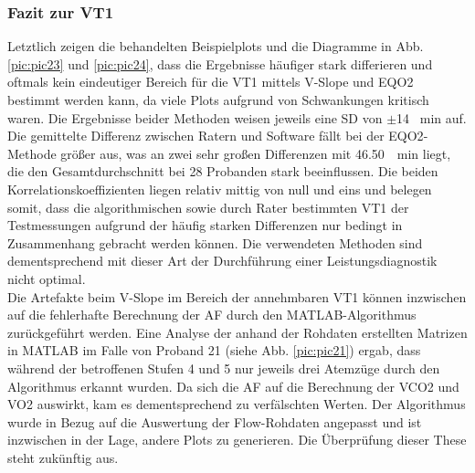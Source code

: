 \subsubsection{Fazit zur VT1}
%
Letztlich zeigen die behandelten Beispielplots und die Diagramme in Abb. \ref{pic:pic23} und \ref{pic:pic24}, dass die Ergebnisse häufiger stark differieren und oftmals kein eindeutiger Bereich für die VT1 mittels V-Slope und \gls{EQO2} bestimmt werden kann, da viele Plots aufgrund von Schwankungen kritisch waren. Die Ergebnisse beider Methoden weisen jeweils eine \gls{SD} von $\pm$14 \si{\per\minute} auf. Die gemittelte Differenz zwischen Ratern und Software fällt bei der \gls{EQO2}-Methode größer aus, was an zwei sehr großen Differenzen mit \SIlist{46,50}{\per\minute} liegt, die den Gesamtdurchschnitt bei 28 Probanden stark beeinflussen. Die beiden Korrelationskoeffizienten liegen relativ mittig von null und eins und belegen somit, dass die algorithmischen sowie durch Rater bestimmten VT1 der Testmessungen aufgrund der häufig starken Differenzen nur bedingt in Zusammenhang gebracht werden können. Die verwendeten Methoden sind dementsprechend mit dieser Art der Durchführung einer Leistungsdiagnostik nicht optimal.\\
Die Artefakte beim V-Slope im Bereich der annehmbaren VT1 können inzwischen auf die fehlerhafte Berechnung der \gls{AF} durch den MATLAB-Algorithmus zurückgeführt werden. Eine Analyse der anhand der Rohdaten erstellten Matrizen in MATLAB im Falle von Proband 21 (siehe Abb. \ref{pic:pic21}) ergab, dass während der betroffenen Stufen 4 und 5 nur jeweils drei Atemzüge durch den Algorithmus erkannt wurden. Da sich die \gls{AF} auf die Berechnung der \gls{VCO2} und \gls{VO2} auswirkt, kam es dementsprechend zu verfälschten Werten. Der Algorithmus wurde in Bezug auf die Auswertung der Flow-Rohdaten angepasst und ist inzwischen in der Lage, andere Plots zu generieren. Die Überprüfung dieser These steht zukünftig aus.
%

